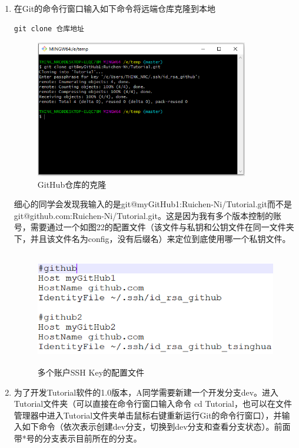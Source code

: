 \documentclass[a4paper,14pt]{article}
\begin{document}
\begin{enumerate}[1. ]
\item 在Git的命令行窗口输入如下命令将远端仓库克隆到本地
{\color{red}
\begin{lstlisting}[language=C]
git clone 仓库地址
\end{lstlisting}
}
\begin{figure}[h]
\centering
\includegraphics[height=6cm]{figure/step4}
\caption{GitHub仓库的克隆}
\end{figure}

\quad

\noindent 细心的同学会发现我输入的是git@myGitHub1:Ruichen-Ni/Tutorial.git而不是git@github.com:Ruichen-Ni/Tutorial.git。这是因为我有多个版本控制的账号，需要通过一个如图22的配置文件（该文件与私钥和公钥文件在同一文件夹下，并且该文件名为config，没有后缀名）来定位到底使用哪一个私钥文件。
\begin{figure}[h]
\centering
\includegraphics[height=5cm]{figure/config}
\caption{多个账户SSH Key的配置文件}
\end{figure}

\newpage
\item 为了开发Tutorial软件的1.0版本，A同学需要新建一个开发分支dev。进入Tutorial文件夹（可以直接在命令行窗口输入命令 {\color{red} cd Tutorial}，也可以在文件管理器中进入Tutorial文件夹单击鼠标右键重新运行Git的命令行窗口），并输入如下命令（依次表示创建dev分支，切换到dev分支和查看分支状态）。前面带*号的分支表示目前所在的分支。


\end{enumerate}
\end{document}
